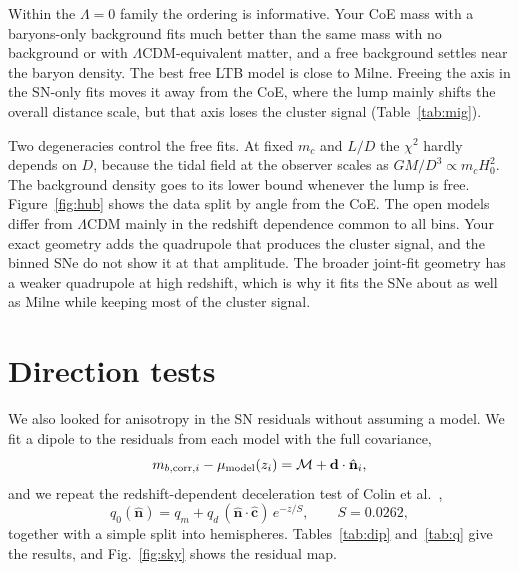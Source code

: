 \documentclass[10pt,twocolumn,letterpaper]{article}
\begin{document}
Within the $\Lambda=0$ family the ordering is informative. Your CoE mass with a baryons-only background fits much better than the same mass with no background or with $\Lambda$CDM-equivalent matter, and a free background settles near the baryon density. The best free LTB model is close to Milne. Freeing the axis in the SN-only fits moves it away from the CoE, where the lump mainly shifts the overall distance scale, but that axis loses the cluster signal (Table~\ref{tab:mig}).

Two degeneracies control the free fits. At fixed $m_c$ and $L/D$ the $\chi^2$ hardly depends on $D$, because the tidal field at the observer scales as $GM/D^3\propto m_cH_0^2$. The background density goes to its lower bound whenever the lump is free. Figure~\ref{fig:hub} shows the data split by angle from the CoE. The open models differ from $\Lambda$CDM mainly in the redshift dependence common to all bins. Your exact geometry adds the quadrupole that produces the cluster signal, and the binned SNe do not show it at that amplitude. The broader joint-fit geometry has a weaker quadrupole at high redshift, which is why it fits the SNe about as well as Milne while keeping most of the cluster signal.



\begin{table}[htbp]\centering\footnotesize
\caption{LTB geometries. $D$ is in the geometric units of the previous note, $m_c$ follows Eq.~(\ref{eq:mc}), $(\ell_0,b_0)$ is the lump axis, $\theta_{\rm CoE}$ its angle from the CoE, and $\chi^2$ the SN value for $z_{\rm HD}>0.023$.}\label{tab:par}
\setlength{\tabcolsep}{2.5pt}
\end{table}




\section{Direction tests}
We also looked for anisotropy in the SN residuals without assuming a model. We fit a dipole to the residuals from each model with the full covariance,
\begin{equation}\label{eq:dip}
m_{b,{\rm corr},i}-\mu_{\rm model}(z_i)=\mathcal M+\mathbf d\cdot\hat{\mathbf n}_i ,
\end{equation}
and we repeat the redshift-dependent deceleration test of Colin et al.\ \cite{Colin2019},
\begin{equation}\label{eq:colin}
q_0(\hat{\mathbf n})=q_m+q_d\,(\hat{\mathbf n}\cdot\hat{\mathbf c})\,e^{-z/S},\qquad S=0.0262,
\end{equation}
together with a simple split into hemispheres. Tables~\ref{tab:dip} and~\ref{tab:q} give the results, and Fig.~\ref{fig:sky} shows the residual map.
\end{document}
